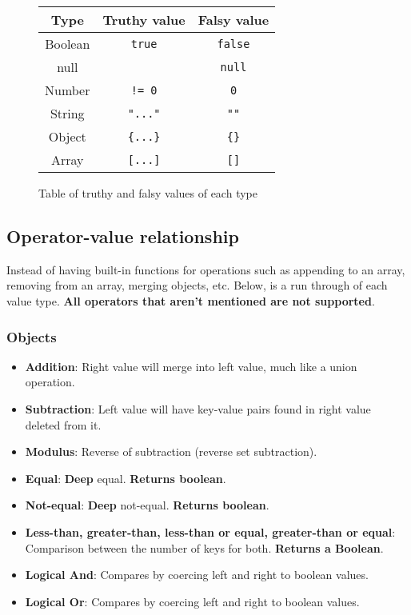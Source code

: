 \documentclass[12pt, letterpaper]{article}
\begin{document}
\begin{figure}[H]
    \begin{center}
        \begin{tabular}{| c | c | c |}
            \hline
            Type & Truthy value & Falsy value\\
            \hline
            Boolean & \verb|true| & \verb|false|\\
            \hline
            null & & \verb|null|\\
            \hline
            Number & \verb|!= 0| & \verb|0|\\
            \hline
            String & \verb|"..."| & \verb|""|\\
            \hline
            Object & \verb|{...}| & \verb|{}|\\
            \hline
            Array & \verb|[...]| & \verb|[]|\\
            \hline
        \end{tabular}
    \end{center}
    \caption{Table of truthy and falsy values of each type}
\end{figure}

\subsection{Operator-value relationship}
\label{sec:operatorvaluerel}

Instead of having built-in functions for operations such as appending to an array, removing from an array, merging objects, etc. Below, is a run through of each value type. \textbf{All operators that aren't mentioned are not supported}.

\subsubsection{Objects}

\begin{itemize}
    \item \textbf{Addition}: Right value will merge into left value, much like a union operation.
    \item \textbf{Subtraction}: Left value will have key-value pairs found in right value deleted from it.
    \item \textbf{Modulus}: Reverse of subtraction (reverse set subtraction).
    \item \textbf{Equal}: \textbf{Deep} equal. \textbf{Returns boolean}.
    \item \textbf{Not-equal}: \textbf{Deep} not-equal. \textbf{Returns boolean}.
    \item \textbf{Less-than, greater-than, less-than or equal, greater-than or equal}: Comparison between the number of keys for both. \textbf{Returns a Boolean}.
    \item \textbf{Logical And}: Compares by coercing left and right to boolean values.
    \item \textbf{Logical Or}: Compares by coercing left and right to boolean values.
\end{itemize}
\end{document}
